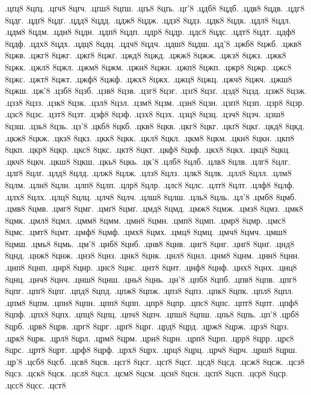 {.цґц8
8цґц.
.цґч8
8цґч.
.цґш8
8цґш.
.цґь8
8цґь.
.цґ'8
.цдб8
8цдб.
.цдв8
8цдв.
.цдг8
8цдг.
.цдґ8
8цдґ.
.цдд8
8цдд.
.цдж8
8цдж.
.цдз8
8цдз.
.цдк8
8цдк.
.цдл8
8цдл.
.цдм8
8цдм.
.цдн8
8цдн.
.цдп8
8цдп.
.цдр8
8цдр.
.цдс8
8цдс.
.цдт8
8цдт.
.цдф8
8цдф.
.цдх8
8цдх.
.цдц8
8цдц.
.цдч8
8цдч.
.цдш8
8цдш.
.цд'8
.цжб8
8цжб.
.цжв8
8цжв.
.цжг8
8цжг.
.цжґ8
8цжґ.
.цжд8
8цжд.
.цжж8
8цжж.
.цжз8
8цжз.
.цжк8
8цжк.
.цжл8
8цжл.
.цжм8
8цжм.
.цжн8
8цжн.
.цжп8
8цжп.
.цжр8
8цжр.
.цжс8
8цжс.
.цжт8
8цжт.
.цжф8
8цжф.
.цжх8
8цжх.
.цжц8
8цжц.
.цжч8
8цжч.
.цжш8
8цжш.
.цж'8
.цзб8
8цзб.
.цзв8
8цзв.
.цзг8
8цзг.
.цзґ8
8цзґ.
.цзд8
8цзд.
.цзж8
8цзж.
.цзз8
8цзз.
.цзк8
8цзк.
.цзл8
8цзл.
.цзм8
8цзм.
.цзн8
8цзн.
.цзп8
8цзп.
.цзр8
8цзр.
.цзс8
8цзс.
.цзт8
8цзт.
.цзф8
8цзф.
.цзх8
8цзх.
.цзц8
8цзц.
.цзч8
8цзч.
.цзш8
8цзш.
.цзь8
8цзь.
.цз'8
.цкб8
8цкб.
.цкв8
8цкв.
.цкг8
8цкг.
.цкґ8
8цкґ.
.цкд8
8цкд.
.цкж8
8цкж.
.цкз8
8цкз.
.цкк8
8цкк.
.цкл8
8цкл.
.цкм8
8цкм.
.цкн8
8цкн.
.цкп8
8цкп.
.цкр8
8цкр.
.цкс8
8цкс.
.цкт8
8цкт.
.цкф8
8цкф.
.цкх8
8цкх.
.цкц8
8цкц.
.цкч8
8цкч.
.цкш8
8цкш.
.цкь8
8цкь.
.цк'8
.цлб8
8цлб.
.цлв8
8цлв.
.цлг8
8цлг.
.цлґ8
8цлґ.
.цлд8
8цлд.
.цлж8
8цлж.
.цлз8
8цлз.
.цлк8
8цлк.
.цлл8
8цлл.
.цлм8
8цлм.
.цлн8
8цлн.
.цлп8
8цлп.
.цлр8
8цлр.
.цлс8
8цлс.
.цлт8
8цлт.
.цлф8
8цлф.
.цлх8
8цлх.
.цлц8
8цлц.
.цлч8
8цлч.
.цлш8
8цлш.
.цль8
8цль.
.цл'8
.цмб8
8цмб.
.цмв8
8цмв.
.цмг8
8цмг.
.цмґ8
8цмґ.
.цмд8
8цмд.
.цмж8
8цмж.
.цмз8
8цмз.
.цмк8
8цмк.
.цмл8
8цмл.
.цмм8
8цмм.
.цмн8
8цмн.
.цмп8
8цмп.
.цмр8
8цмр.
.цмс8
8цмс.
.цмт8
8цмт.
.цмф8
8цмф.
.цмх8
8цмх.
.цмц8
8цмц.
.цмч8
8цмч.
.цмш8
8цмш.
.цмь8
8цмь.
.цм'8
.цнб8
8цнб.
.цнв8
8цнв.
.цнг8
8цнг.
.цнґ8
8цнґ.
.цнд8
8цнд.
.цнж8
8цнж.
.цнз8
8цнз.
.цнк8
8цнк.
.цнл8
8цнл.
.цнм8
8цнм.
.цнн8
8цнн.
.цнп8
8цнп.
.цнр8
8цнр.
.цнс8
8цнс.
.цнт8
8цнт.
.цнф8
8цнф.
.цнх8
8цнх.
.цнц8
8цнц.
.цнч8
8цнч.
.цнш8
8цнш.
.цнь8
8цнь.
.цн'8
.цпб8
8цпб.
.цпв8
8цпв.
.цпг8
8цпг.
.цпґ8
8цпґ.
.цпд8
8цпд.
.цпж8
8цпж.
.цпз8
8цпз.
.цпк8
8цпк.
.цпл8
8цпл.
.цпм8
8цпм.
.цпн8
8цпн.
.цпп8
8цпп.
.цпр8
8цпр.
.цпс8
8цпс.
.цпт8
8цпт.
.цпф8
8цпф.
.цпх8
8цпх.
.цпц8
8цпц.
.цпч8
8цпч.
.цпш8
8цпш.
.цпь8
8цпь.
.цп'8
.црб8
8црб.
.црв8
8црв.
.црг8
8црг.
.црґ8
8црґ.
.црд8
8црд.
.црж8
8црж.
.црз8
8црз.
.црк8
8црк.
.црл8
8црл.
.црм8
8црм.
.црн8
8црн.
.црп8
8црп.
.црр8
8црр.
.црс8
8црс.
.црт8
8црт.
.црф8
8црф.
.црх8
8црх.
.црц8
8црц.
.црч8
8црч.
.црш8
8црш.
.цр'8
.цсб8
8цсб.
.цсв8
8цсв.
.цсг8
8цсг.
.цсґ8
8цсґ.
.цсд8
8цсд.
.цсж8
8цсж.
.цсз8
8цсз.
.цск8
8цск.
.цсл8
8цсл.
.цсм8
8цсм.
.цсн8
8цсн.
.цсп8
8цсп.
.цср8
8цср.
.цсс8
8цсс.
.цст8
}
